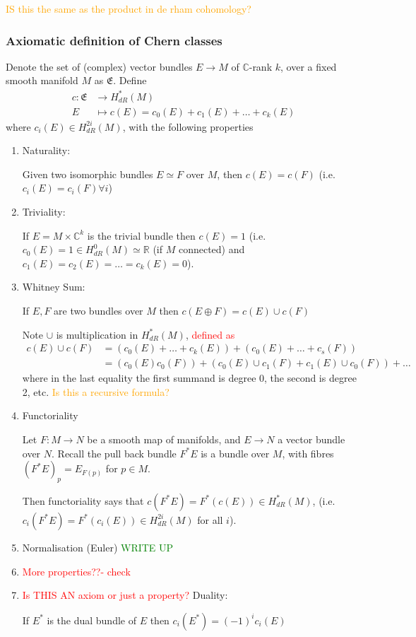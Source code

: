 \documentclass[a4paper]{article}
\theoremstyle{definition} \newtheorem*{definition}{Definition}
\theoremstyle{definition} \newtheorem*{definitions}{Definitions}
\theoremstyle{plain} \newtheorem{theorem}{Theorem}[section]
\theoremstyle{plain} \newtheorem{proposition}[theorem]{Proposition}
\theoremstyle{plain} \newtheorem{corollary}[theorem]{Corollary}
\theoremstyle{plain} \newtheorem{lemma}[theorem]{Lemma}
\theoremstyle{plain} \newtheorem{example}[theorem]{Example}
\newcommand{\checkCorrect}[1]{\textcolor{red}{#1}}
\newcommand{\understandBetter}[1]{\textcolor{orange}{#1}}
\newcommand{\question}[1]{\textcolor{orange}{#1}}
\newcommand{\finish}[1]{\textcolor{green}{#1}}
\newcommand{\realnos}{\mathbb{R}}
\newcommand{\complexnos}{\mathbb{C}}
\begin{document}
\question{IS this the same as the product in de rham cohomology?}

\subsubsection{Axiomatic definition of Chern classes}
Denote the set of (complex) vector bundles $E\to M$ of $\complexnos$-rank $k$, over a fixed smooth manifold $M$ as $\mathfrak{E}$. Define
\begin{align*}
    c: \mathfrak{E} & \to H^*_{dR}(M) \\
    E & \mapsto c(E) = c_0(E)+c_1(E)+\ldots +c_k(E)
\end{align*}
where $c_i(E)\in H^{2i}_{dR}(M)$, with the following properties
\begin{enumerate}
    \item Naturality:
    
    Given two isomorphic bundles $E\simeq F$ over $M$, then $c(E)=c(F)$ (i.e. $c_i(E)=c_i(F) \forall i$)

    \item Triviality:

    If $E=M\times \complexnos^k$ is the trivial bundle then $c(E)=1$ (i.e. $c_0(E)=1\in H^0_{dR}(M)\simeq \realnos$ (if $M$ connected) and $c_1(E)=c_2(E)=\ldots =c_k(E)=0$). 

    \item Whitney Sum:

    If $E, F$ are two bundles over $M$ then
    $c(E\oplus F) = c(E) \cup c(F)$
    
    Note $\cup$ is multiplication in $H^*_{dR}(M)$, \checkCorrect{defined as}
    \begin{align*}
        c(E) \cup c(F) & = (c_0(E)+\ldots + c_{k}(E)) + (c_0(E)+\ldots + c_{s}(F)) \\
        & = (c_0(E) c_0(F)) + (c_0(E)\cup c_1(F) + c_1(E)\cup c_0(F)) + \ldots
    \end{align*}
    where in the last equality the first summand is degree 0, the second is degree 2, etc. 
    \understandBetter{Is this a recursive formula?}
    
    \item Functoriality

    Let $F:M\to N$ be a smooth map of manifolds, and $E\to N$ a vector bundle over $N$. Recall the pull back bundle $F^*E$ is a bundle over $M$, with fibres $(F^*E)_p=E_{F(p)}$ for $p\in M$. 
    
    Then functoriality says that 
    $c(F^* E) = F^*(c(E)) \in H^*_{dR}(M)$, (i.e. $c_i(F^* E) = F^*(c_i(E)) \in H^{2i}_{dR}(M)$ for all $i$).
    
    \item Normalisation (Euler)
    \finish{WRITE UP}

    \item 
    \checkCorrect{More properties??- check}

    \item \checkCorrect{Is THIS AN axiom or just a property?} Duality:

    If $E^*$ is the dual bundle of $E$ then $c_i(E^*)=(-1)^ic_i(E)$

\end{enumerate}
\end{document}
